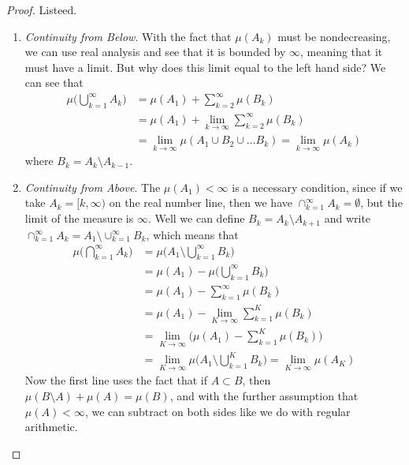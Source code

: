   \begin{proof}
    Listeed. 
    \begin{enumerate}
      \item \textit{Continuity from Below}. With the fact that $\mu(A_k)$ must be nondecreasing, we can use real analysis and see that it is bounded by $\infty$, meaning that it must have a limit. But why does this limit equal to the left hand side? We can see that 
        \begin{align}
          \mu\bigg( \bigcup_{k=1}^\infty A_k \bigg) & = \mu(A_1) + \sum_{k=2}^\infty \mu(B_k) \\
          & = \mu(A_1) + \lim_{k \rightarrow \infty} \sum_{k=2}^\infty \mu(B_k) \\
          & = \lim_{k \rightarrow \infty} \mu(A_1 \cup B_2 \cup \ldots B_k)  = \lim_{k \rightarrow \infty} \mu(A_k) 
        \end{align}
        where $B_k = A_k \setminus A_{k-1}$. 

      \item \textit{Continuity from Above}. The $\mu(A_1) < \infty$ is a necessary condition, since if we take $A_k = [k, \infty)$ on the real number line, then we have $\cap_{k=1}^\infty A_k = \emptyset$, but the limit of the measure is $\infty$. Well we can define $B_k = A_k \setminus A_{k+1}$ and write $\cap_{k=1}^\infty A_k = A_1 \setminus \cup_{k=1}^\infty B_k$, which means that 
        \begin{align}
          \mu\bigg( \bigcap_{k=1}^\infty A_k \bigg) & = \mu\bigg( A_1 \setminus \bigcup_{k=1}^\infty B_k \bigg) \\
          & = \mu(A_1) - \mu\bigg( \bigcup_{k=1}^\infty B_k\bigg) \\
          & = \mu(A_1) - \sum_{k=1}^\infty \mu(B_k) \\
          & = \mu(A_1) - \lim_{K \rightarrow \infty} \sum_{k=1}^K \mu(B_k) \\
          & = \lim_{K \rightarrow \infty} \bigg( \mu(A_1) - \sum_{k=1}^K \mu(B_k) \bigg) \\
          & = \lim_{K \rightarrow \infty} \mu \bigg( A_1 \setminus \bigcup_{k=1}^K B_k \bigg) = \lim_{K \rightarrow \infty} \mu(A_K)
        \end{align}
        Now the first line uses the fact that if $A \subset B$, then $\mu(B \setminus A) + \mu(A) = \mu(B)$, and with the further assumption that $\mu(A) < \infty$, we can subtract on both sides like we do with regular arithmetic. 
    \end{enumerate}
  \end{proof}

